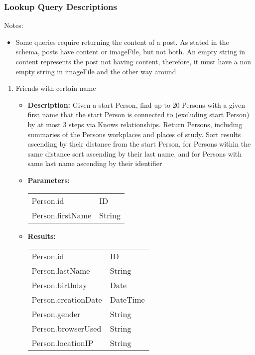 \subsubsection{Lookup Query Descriptions}
\label{sub:queries}

Notes:
\begin{itemize}
\item Some queries require returning the content of a post. As stated in the
    schema, posts have content or imageFile, but not both. An empty string in
    content represents the post not having content, therefore, it must have a
    non empty string in imageFile and the other way around.
\end{itemize}

{\small
\begin{enumerate}
	\item Friends with certain name
	\begin{itemize}
		\item \textbf{Description:}
            Given a start Person, find up to 20 Persons with a given first name
            that the start Person is connected to (excluding start Person) by
            at most 3 steps via Knows relationships. Return Persons, including
            summaries of the Persons workplaces and places of study.  Sort
            results ascending by their distance from the start Person, for
            Persons within the same distance sort ascending by their last name,
            and for Persons with same last name ascending by their identifier
		\item \textbf{Parameters:} \\
			\begin{tabular}{ll}
				Person.id 										& ID \\
				Person.firstName								& String \\
			\end{tabular}
		\item \textbf{Results:} \\
			\begin{tabular}{ll}
				Person.id 										& ID \\
				Person.lastName									& String \\
				Person.birthday 								& Date \\
				Person.creationDate 							& DateTime  \\
				Person.gender 									& String \\
				Person.browserUsed 								& String \\
				Person.locationIP 								& String \\

\end{tabular}
\end{itemize}
\end{enumerate}}
